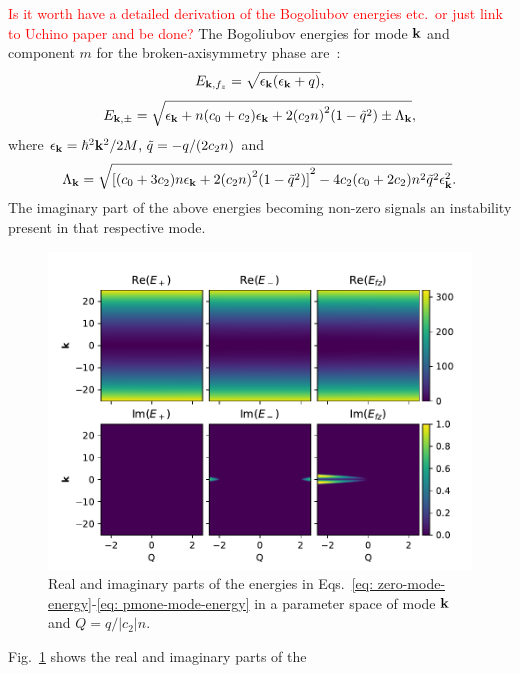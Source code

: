 \textcolor{red}{Is it worth have a detailed derivation of the
Bogoliubov energies etc.\ or just link to Uchino paper and be done?}
The Bogoliubov energies for mode \( \vb{k} \) and component \( m \) for the
broken-axisymmetry phase are~\cite{Uchino2010}:
\begin{equation}
    E_{\vb{k}, {f_z}} = \sqrt{\epsilon_{\vb{k}}(\epsilon_{\vb{k}} + q)},
    \label{eq: zero-mode-energy}
\end{equation}
\begin{equation}
    E_{{\vb{k}}, \pm} = \sqrt{\epsilon_{\vb{k}} + n(c_0 + c_2)\epsilon_{\vb{k}} 
    + 2{(c_2n)}^2(1 - \tilde{q}^2) \pm \Lambda_{\vb{k}}},
    \label{eq: pmone-mode-energy}
\end{equation}
where \( \epsilon_{\vb{k}} = \hbar^2\vb{k}^2 / 2M$, \( \tilde{q} = -q/(2c_2n) \)
and
\begin{equation}
    \Lambda_{\vb{k}} = \sqrt{{[(c_0+3c_2)n\epsilon_{\vb{k}} 
    + 2{(c_2n)}^2(1-\tilde{q}^2)]}^2 
    - 4c_2(c_0+2c_2)n^2\tilde{q}^2\epsilon_{\vb{k}}^2}.
\end{equation}
The imaginary part of the above energies becoming non-zero signals an
instability present in that respective mode.
\begin{figure}[tb]
    \centering
    \includegraphics[width=\textwidth]{gfx/ch-spin1/dens_spin_energies.pdf}
    \caption{Real and imaginary parts of the energies in
    Eqs.~\eqref{eq: zero-mode-energy}-\eqref{eq: pmone-mode-energy} in a
    parameter space of mode \( \vb{k} \) and
    \( Q=q/|c_2|n \).\label{fig: dens-spin-energies}}
\end{figure}
Fig.~\ref{fig: dens-spin-energies} shows the real and imaginary parts of the
